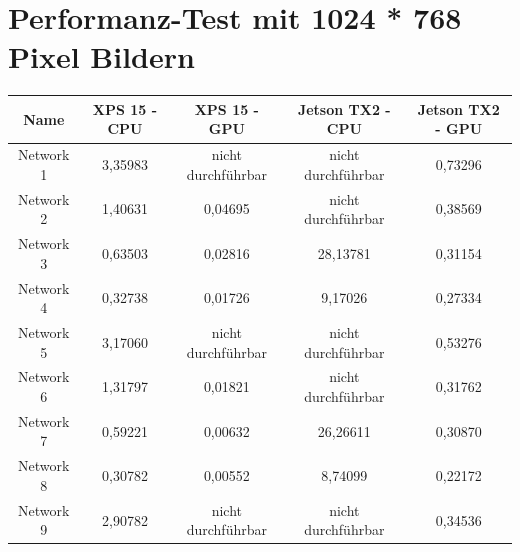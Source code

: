 \section{Performanz-Test mit 1024 * 768 Pixel Bildern}
\begin{table}[H]
    \centering
    \begin{tabular}{ |c|c|c|c|c| }
        \hline
        \textbf{Name} & \textbf{XPS 15 - CPU} & \textbf{XPS 15 - GPU} & \textbf{Jetson TX2 - CPU} & \textbf{Jetson TX2 - GPU}   \\ \hline
        Network  1 & 3,35983                                & \textcolor{danger}{nicht durchführbar} & \textcolor{danger}{nicht durchführbar} & 0,73296                                \\ \hline
        Network  2 & 1,40631                                & 0,04695                                & \textcolor{danger}{nicht durchführbar} & 0,38569                                \\ \hline
        Network  3 & 0,63503                                & 0,02816                                & 28,13781                               & 0,31154                                \\ \hline
        Network  4 & 0,32738                                & 0,01726                                & 9,17026                                & 0,27334                                \\ \hline
        Network  5 & 3,17060                                & \textcolor{danger}{nicht durchführbar} & \textcolor{danger}{nicht durchführbar} & 0,53276                                \\ \hline
        Network  6 & 1,31797                                & 0,01821                                & \textcolor{danger}{nicht durchführbar} & 0,31762                                \\ \hline
        Network  7 & 0,59221                                & 0,00632                                & 26,26611                               & 0,30870                                \\ \hline
        Network  8 & 0,30782                                & 0,00552                                & 8,74099                                & 0,22172                                \\ \hline
        Network  9 & 2,90782                                & \textcolor{danger}{nicht durchführbar} & \textcolor{danger}{nicht durchführbar} & 0,34536                                \\ \hline

\end{tabular}
\end{table}
